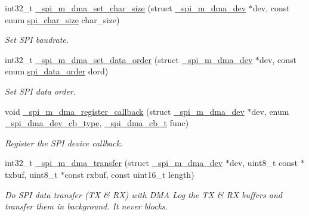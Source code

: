 \begin{DoxyCompactItemize}
int32\+\_\+t \hyperlink{group__hpl__spi_ga566bf1203a9a6c7576cd75c413b771b0}{\+\_\+spi\+\_\+m\+\_\+dma\+\_\+set\+\_\+char\+\_\+size} (struct \hyperlink{group__hpl__spi_ga63a73aeb4b9cc78590635e10bb0b1e8b}{\+\_\+spi\+\_\+m\+\_\+dma\+\_\+dev} $\ast$dev, const enum \hyperlink{group__hpl__spi_ga4a3ef460c2cea333834811806f32d60a}{spi\+\_\+char\+\_\+size} char\+\_\+size)
\begin{DoxyCompactList}\small\item\em Set S\+PI baudrate. \end{DoxyCompactList}\item 
int32\+\_\+t \hyperlink{group__hpl__spi_ga854f4bbf489e7706a61da7234abccae9}{\+\_\+spi\+\_\+m\+\_\+dma\+\_\+set\+\_\+data\+\_\+order} (struct \hyperlink{group__hpl__spi_ga63a73aeb4b9cc78590635e10bb0b1e8b}{\+\_\+spi\+\_\+m\+\_\+dma\+\_\+dev} $\ast$dev, const enum \hyperlink{group__hpl__spi_gabaa69dbc0601cb5b1e2681400598a4b2}{spi\+\_\+data\+\_\+order} dord)
\begin{DoxyCompactList}\small\item\em Set S\+PI data order. \end{DoxyCompactList}\item 
void \hyperlink{group__hpl__spi_ga14c36b87921d43cd194fdd99220b4b8f}{\+\_\+spi\+\_\+m\+\_\+dma\+\_\+register\+\_\+callback} (struct \hyperlink{group__hpl__spi_ga63a73aeb4b9cc78590635e10bb0b1e8b}{\+\_\+spi\+\_\+m\+\_\+dma\+\_\+dev} $\ast$dev, enum \hyperlink{hpl__spi__dma_8h_a620c54d725b7b6e7f39ebf1c3e67d56f}{\+\_\+spi\+\_\+dma\+\_\+dev\+\_\+cb\+\_\+type}, \hyperlink{hpl__spi__dma_8h_ae7c46033731e549163962bd7c79cab78}{\+\_\+spi\+\_\+dma\+\_\+cb\+\_\+t} func)
\begin{DoxyCompactList}\small\item\em Register the S\+PI device callback. \end{DoxyCompactList}\item 
int32\+\_\+t \hyperlink{group__hpl__spi_ga554fa0d30abe52ef12ec3046d12bbec2}{\+\_\+spi\+\_\+m\+\_\+dma\+\_\+transfer} (struct \hyperlink{group__hpl__spi_ga63a73aeb4b9cc78590635e10bb0b1e8b}{\+\_\+spi\+\_\+m\+\_\+dma\+\_\+dev} $\ast$dev, uint8\+\_\+t const $\ast$txbuf, uint8\+\_\+t $\ast$const rxbuf, const uint16\+\_\+t length)
\begin{DoxyCompactList}\small\item\em Do S\+PI data transfer (TX \& RX) with D\+MA Log the TX \& RX buffers and transfer them in background. It never blocks. \end{DoxyCompactList}\item 

\end{DoxyCompactItemize}
